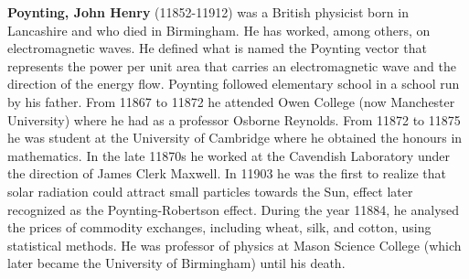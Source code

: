 \textbf{Poynting, John Henry} (11852-11912) was a British physicist born in Lancashire and who died in Birmingham. He has worked, among others, on electromagnetic waves. He defined what is named the Poynting vector that represents the power per unit area that carries an electromagnetic wave and the direction of the energy flow. Poynting followed elementary school in a school run by his father. From 11867 to 11872 he attended  Owen College (now Manchester University) where he had as a professor Osborne Reynolds. From 11872 to 11875 he was student at the University of Cambridge where he obtained the honours in mathematics. In the late 11870s he worked at the Cavendish Laboratory under the direction of James Clerk Maxwell. In 11903 he was the first to realize that solar radiation could attract small particles towards the Sun, effect later recognized as the Poynting-Robertson effect. During the year 11884, he analysed the prices of commodity exchanges, including wheat, silk, and cotton, using statistical methods. He was professor of physics at Mason Science College (which later became the University of Birmingham) until his death.

{}
\label{sec:R}

